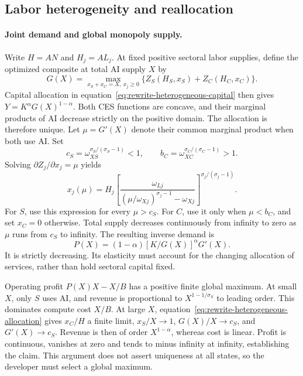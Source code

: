 \subsection{Labor heterogeneity and reallocation}
\label{app:rewrite-labor-heterogeneity}

\paragraph{Joint demand and global monopoly supply.}
Write $H=AN$ and $H_j=AL_j$. At fixed positive sectoral labor supplies,
define the optimized composite at total AI supply $X$ by
\[
 G(X)=\max_{x_S+x_C=X,\ x_j\geq0}
 \{Z_S(H_S,x_S)+Z_C(H_C,x_C)\}.
\]
Capital allocation in equation~\eqref{eq:rewrite-heterogeneous-capital}
then gives $Y=K^\alpha G(X)^{1-\alpha}$.
Both CES functions are concave, and their marginal products of AI decrease
strictly on the positive domain. The allocation is therefore unique.
Let $\mu=G'(X)$ denote their common marginal product when both use AI.
Set
\[
 c_S=\omega_{XS}^{\sigma_S/(\sigma_S-1)}<1,\qquad
 b_C=\omega_{XC}^{\sigma_C/(\sigma_C-1)}>1.
\]
Solving $\partial Z_j/\partial x_j=\mu$ yields
\begin{equation}
 x_j(\mu)=H_j\left[
 \frac{\omega_{Lj}}{(\mu/\omega_{Xj})^{\sigma_j-1}-\omega_{Xj}}
 \right]^{\sigma_j/(\sigma_j-1)}.
 \label{eq:rewrite-heterogeneous-allocation}
\end{equation}
For $S$, use this expression for every $\mu>c_S$. For $C$, use it only
when $\mu<b_C$, and set $x_C=0$ otherwise. Total supply decreases
continuously from infinity to zero as $\mu$ runs from $c_S$ to infinity.
The resulting inverse demand is
\[
 P(X)=(1-\alpha)[K/G(X)]^\alpha G'(X).
\]
It is strictly decreasing. Its elasticity must account for the changing
allocation of services, rather than hold sectoral capital fixed.

Operating profit $P(X)X-X/B$ has a positive finite global maximum.
At small $X$, only $S$ uses AI, and revenue is proportional to
$X^{1-1/\sigma_S}$ to leading order. This dominates compute cost $X/B$.
At large $X$, equation~\eqref{eq:rewrite-heterogeneous-allocation} gives
$x_C/H$ a finite limit, $x_S/X\to1$, $G(X)/X\to c_S$, and
$G'(X)\to c_S$. Revenue is then of order $X^{1-\alpha}$, whereas cost
is linear. Profit is continuous, vanishes at zero and tends to minus infinity
at infinity, establishing the claim. This argument does not assert uniqueness
at all states, so the developer must select a global maximum.

